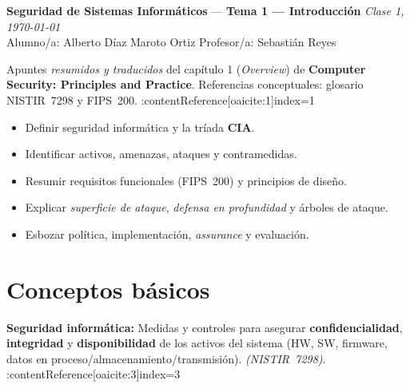 \documentclass[11pt,a4paper]{article}
\newcommand{\asignatura}{Seguridad de Sistemas Informáticos}
\newcommand{\tema}{Tema 1 — Introducción}
\newcommand{\clase}{Clase 1}
\newcommand{\fecha}{\today}
\begin{document}
    {\large \textbf{\asignatura} \;—\; \textbf{\tema} \hfill \textit{\clase, \fecha}}\\[0.6em]
    \faUser\; Alumno/a: Alberto Díaz Maroto Ortiz\hfill
    \faChalkboardTeacher\; Profesor/a: Sebastián Reyes

    \vspace{1em}
    \tableofcontents
    \vspace{1em}

    \begin{NotaBox}
        Apuntes \textit{resumidos y traducidos} del capítulo 1 (\textit{Overview}) de \textbf{Computer Security: Principles and Practice}. Referencias conceptuales: glosario NISTIR~7298 y FIPS~200. :contentReference[oaicite:1]{index=1}
    \end{NotaBox}

    \begin{ObjetivosBox}
        \begin{itemize}
            \item Definir seguridad informática y la tríada \textbf{CIA}.
            \item Identificar activos, amenazas, ataques y contramedidas.
            \item Resumir requisitos funcionales (FIPS~200) y principios de diseño.
            \item Explicar \textit{superficie de ataque}, \textit{defensa en profundidad} y árboles de ataque.
            \item Esbozar política, implementación, \textit{assurance} y evaluación.
        \end{itemize}
    \end{ObjetivosBox}

    \section{Conceptos básicos}
    \begin{DefBox}
        \textbf{Seguridad informática:} Medidas y controles para asegurar \textbf{confidencialidad}, \textbf{integridad} y \textbf{disponibilidad} de los activos del sistema (HW, SW, firmware, datos en proceso/almacenamiento/transmisión). \textit{(NISTIR~7298)}. :contentReference[oaicite:3]{index=3}
    \end{DefBox}
\end{document}
